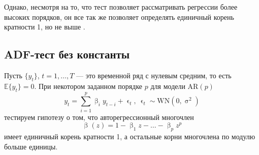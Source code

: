 \documentclass[a4paper, 14pt]{extreport}
\numberwithin{equation}{section}
\renewcommand{\beta}{\upbeta}
\renewcommand{\epsilon}{\upvarepsilon}
\renewcommand{\sigma}{\upsigma}
\newcommand{\E}{\mathbb E}
\numberwithin{equation}{section}
\begin{document}
	Однако, несмотря на то, что тест позволяет рассматривать регрессии более высоких порядков, он все так же позволяет определять единичный корень кратности 1, но не выше \cite{14, 15}.
	\subsection{ADF-тест без константы}
	Пусть $\{y_t\}$, $t=1,\ldots, T$ --- это временной ряд с нулевым средним, то есть $\E \{y_t\}=0$.
	При некотором заданном порядке $p$ для модели AR$(p)$
	\begin{equation}\label{eq:adf-1}
		y_t=\sum_{i=1}^{p}\beta_i y_{t-i}+\epsilon_t,\ \epsilon_t\sim \text{WN}(0,\sigma^2)
	\end{equation}
	тестируем гипотезу о том, что авторегрессионный многочлен
	\begin{equation}
		\beta(z)=1-\beta_1 z-\dots-\beta_p z^p
	\end{equation}
	имеет единичный корень кратности 1, а остальные корни многочлена по модулю больше единицы.
	
\end{document}
